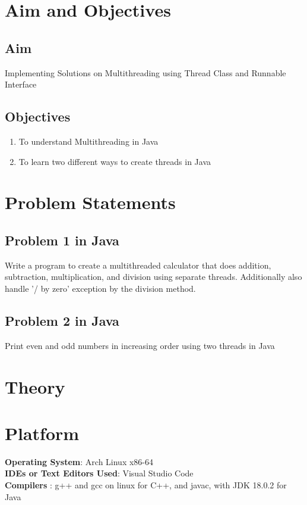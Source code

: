 \documentclass[11pt]{article}
\begin{document}
\tableofcontents
\thispagestyle{empty}
\clearpage


\setcounter{page}{1}

\section{Aim and Objectives}
\subsection*{Aim}
Implementing Solutions on Multithreading using Thread Class and Runnable Interface
\subsection*{Objectives}
\begin{enumerate}
	\item To understand Multithreading in Java
	\item To learn two different ways to create threads in Java
\end{enumerate}
\section{Problem Statements}

\subsection{Problem 1 in Java}
Write a program to create a multithreaded calculator that does addition, subtraction,
multiplication, and division using separate threads.
Additionally also handle '/ by zero' exception by the division method.

\subsection{Problem 2 in Java}
Print even and odd numbers in increasing order using two threads in Java

\section{Theory}
\section{Platform}
\textbf{Operating System}: Arch Linux x86-64 \\
\textbf{IDEs or Text Editors Used}: Visual Studio Code\\
\textbf{Compilers} : g++ and gcc on linux for C++, and javac, with JDK 18.0.2 for Java\\
\end{document}
